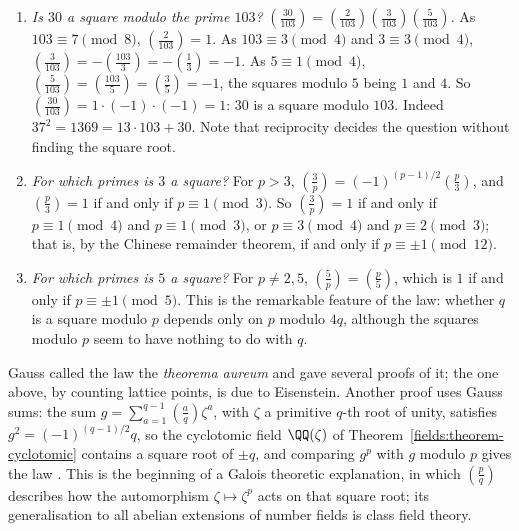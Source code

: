 \begin{example}\label{number-theory:example-reciprocity}
\begin{enumerate}
\item \emph{Is $30$ a square modulo the prime $103$?} $(\frac{30}{103}) = (\frac{2}{103})(\frac{3}{103})(\frac{5}{103})$. As $103 \equiv 7 \pmod 8$, $(\frac{2}{103}) = 1$. As $103 \equiv 3 \pmod 4$ and
$3 \equiv 3 \pmod 4$, $(\frac{3}{103}) = -(\frac{103}{3}) = -(\frac{1}{3}) = -1$. As $5 \equiv 1 \pmod 4$, $(\frac{5}{103}) = (\frac{103}{5}) = (\frac{3}{5}) = -1$, the squares modulo $5$ being $1$ and $4$.
So $(\frac{30}{103}) = 1 \cdot (-1) \cdot (-1) = 1$: $30$ is a square modulo $103$. Indeed $37^2 = 1369 = 13 \cdot 103 + 30$. Note that reciprocity decides the question without finding the square root.
\item \emph{For which primes is $3$ a square?} For $p > 3$, $(\frac{3}{p}) = (-1)^{(p-1)/2}(\frac{p}{3})$, and $(\frac{p}{3}) = 1$ if and only if $p \equiv 1 \pmod 3$. So $(\frac{3}{p}) = 1$ if and only if
$p \equiv 1 \pmod 4$ and $p \equiv 1 \pmod 3$, or $p \equiv 3 \pmod 4$ and $p \equiv 2 \pmod 3$; that is, by the Chinese remainder theorem, if and only if $p \equiv \pm1 \pmod{12}$.
\item \emph{For which primes is $5$ a square?} For $p \neq 2, 5$, $(\frac{5}{p}) = (\frac{p}{5})$, which is $1$ if and only if $p \equiv \pm1 \pmod 5$. This is the remarkable feature of the law: whether $q$
is a square modulo $p$ depends only on $p$ modulo $4q$, although the squares modulo $p$ seem to have nothing to do with $q$.
\end{enumerate}
\end{example}

\begin{remark}\label{number-theory:remark-reciprocity}
Gauss called the law the \emph{theorema aureum} and gave several proofs of it; the one above, by counting lattice points, is due to Eisenstein. Another proof uses Gauss sums: the sum
$g = \sum_{a=1}^{q-1}(\frac{a}{q})\zeta^a$, with $\zeta$ a primitive $q$-th root of unity, satisfies $g^2 = (-1)^{(q-1)/2}q$, so the cyclotomic field $\QQ(\zeta)$ of
Theorem~\ref{fields:theorem-cyclotomic} contains a square root of $\pm q$, and comparing $g^p$ with $g$ modulo $p$ gives the law \cite{ireland-rosen}. This is the beginning of a Galois theoretic
explanation, in which $(\frac{p}{q})$ describes how the automorphism $\zeta \mapsto \zeta^p$ acts on that square root; its generalisation to all abelian extensions of number fields is class field
theory.
\end{remark}

